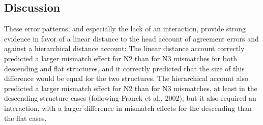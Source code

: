 \documentclass[12pt,titlepage]{article}
\newcommand{\IGNORE}[1]{} %
\begin{document}
{}\IGNORE{

NOTHING IN HERE IS UPDATED FOR S#54

misc cnts: \\

overall \\
  struc:  \Fs{52}{.08}{.60}, \p{772}; \Fi{22}{.01}{12.07}, \p{893} \\
  num:  \Fs[2]{104}{9.21}{.56}, \p{001}; \Fi[2]{44}{6.59}{3.48}, \p{01} \\
  int:  \Fs[2]{104}{1.42}{.66}, \p{245}; \Fi[2]{44}{1.20}{3.48}, \p{310} \\

num pairs \\
  SPSvSSS:  \Fs{52}{8.50}{.27}, \p{01}; \Fi{23}{10.59}{1.89}, \p{01} \\
  SSPvSSS:  \Fs{52}{16.46}{.30}, \p{001}; \Fi{23}{16.37}{2.69}, \p{01} \\
  SPSvSSP:  \Fs{52}{1.92}{.28}, \p{171}; \Fi{23}{.78}{5.95}, \p{384} \\

mismatch \\
  struc:  \Fs{52}{.36}{1.56}, \p{548};\Fi{22}{.77}{3.25}, \p{388} \\
  num:  \Fs{52}{1.92}{.55}, \p{171}; \Fi{22}{.79}{5.88}, \p{381} \\
  int:  \Fs{52}{2.10}{.81}, \p{153}; \Fi{22}{1.28}{5.88}, \p{270} \\

}

\subsection{Discussion}

These error patterns, and especially the lack of an interaction, provide
strong evidence in favor of a linear distance to the head account of
agreement errors and against a hierarchical distance account: The linear
distance account correctly predicted a larger mismatch effect for N2 than
for N3 mismatches for both descending and flat structures, and it correctly
predicted that the size of this difference would be equal for the two
structures.  The hierarchical account also predicted a larger mismatch
effect for N2 than for N3 mismatches, at least in the descending structure
cases (following Franck et al., 2002), but it also required an
interaction\IGNORE{ in the mismatch analyses}, with a larger difference in
mismatch effects for the descending than the flat cases.
\end{document}
